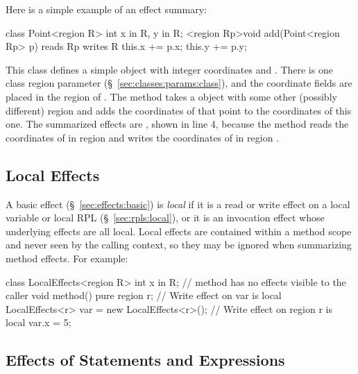 Here is a simple example of an effect summary:
%
\begin{numbereddpjlisting}
class Point<region R> {
    int x in R, y in R;
    <region Rp>void add(Point<region Rp> p) 
      reads Rp writes R {
        this.x += p.x;
        this.y += p.y;
    }
}
\end{numbereddpjlisting}
%
This class defines a simple  object with integer
coordinates  and .  There is one class region parameter
 (\S~\ref{sec:classes:params:class}), and the coordinate fields
are placed in the region of .  The  method takes a
 object with some other (possibly different) region
 and adds the coordinates of that point to the coordinates of
this one.  The summarized effects are , shown
in line 4, because the method reads the coordinates of  in
region  and writes the coordinates of  in region
.

\subsection{Local Effects%
\label{sec:effects:local}}

A basic effect (\S~\ref{sec:effects:basic}) is \emph{local} if it is a
read or write effect on a local variable or local RPL
(\S~\ref{sec:rpls:local}), or it is an invocation effect whose
underlying effects are all local.  Local effects are contained within
a method scope and never seen by the calling context, so they may be
ignored when summarizing method effects.  For example:
%
\begin{dpjlisting}
class LocalEffects<region R> {
    int x in R;
    // method has no effects visible to the caller
    void method() pure {
        region r;
        // Write effect on var is local
        LocalEffects<r> var = new LocalEffects<r>();
        // Write effect on region r is local
        var.x = 5;
    }
}
\end{dpjlisting}

\subsection{Effects of Statements and Expressions%
\label{sec:effects:stmt-exp}}

